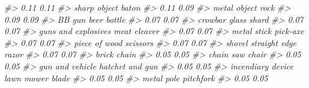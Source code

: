 \documentclass[
]{krantz}
\makeatletter
\newenvironment{Shaded}{\begin{snugshade}}{\end{snugshade}}
\newcommand{\CommentTok}[1]{\textcolor[rgb]{0.37,0.37,0.37}{\textit{#1}}}
\newenvironment{kframe}{%
\medskip{}
\setlength{\fboxsep}{.8em}
 \def\at@end@of@kframe{}%
 \ifinner\ifhmode%
  \def\at@end@of@kframe{\end{minipage}}%
  \begin{minipage}{\columnwidth}%
 \fi\fi%
 \def\FrameCommand##1{\hskip\@totalleftmargin \hskip-\fboxsep
 \colorbox{shadecolor}{##1}\hskip-\fboxsep
     \hskip-\linewidth \hskip-\@totalleftmargin \hskip\columnwidth}%
 \MakeFramed {\advance\hsize-\width
   \@totalleftmargin\z@ \linewidth\hsize
   \@setminipage}}%
 {\par\unskip\endMakeFramed%
 \at@end@of@kframe}
\renewenvironment{Shaded}{\begin{kframe}}{\end{kframe}}
\makeatother
\begin{document}
\begin{Shaded}
\begin{Highlighting}[]
\CommentTok{\#\textgreater{}                             0.11                             0.11 }
\CommentTok{\#\textgreater{}                     sharp object                            baton }
\CommentTok{\#\textgreater{}                             0.11                             0.09 }
\CommentTok{\#\textgreater{}                     metal object                             rock }
\CommentTok{\#\textgreater{}                             0.09                             0.09 }
\CommentTok{\#\textgreater{}                           BB gun                      beer bottle }
\CommentTok{\#\textgreater{}                             0.07                             0.07 }
\CommentTok{\#\textgreater{}                          crowbar                      glass shard }
\CommentTok{\#\textgreater{}                             0.07                             0.07 }
\CommentTok{\#\textgreater{}              guns and explosives                     meat cleaver }
\CommentTok{\#\textgreater{}                             0.07                             0.07 }
\CommentTok{\#\textgreater{}                      metal stick                         pick{-}axe }
\CommentTok{\#\textgreater{}                             0.07                             0.07 }
\CommentTok{\#\textgreater{}                    piece of wood                         scissors }
\CommentTok{\#\textgreater{}                             0.07                             0.07 }
\CommentTok{\#\textgreater{}                           shovel              straight edge razor }
\CommentTok{\#\textgreater{}                             0.07                             0.07 }
\CommentTok{\#\textgreater{}                            brick                            chain }
\CommentTok{\#\textgreater{}                             0.05                             0.05 }
\CommentTok{\#\textgreater{}                        chain saw                            chair }
\CommentTok{\#\textgreater{}                             0.05                             0.05 }
\CommentTok{\#\textgreater{}                  gun and vehicle                  hatchet and gun }
\CommentTok{\#\textgreater{}                             0.05                             0.05 }
\CommentTok{\#\textgreater{}                incendiary device                 lawn mower blade }
\CommentTok{\#\textgreater{}                             0.05                             0.05 }
\CommentTok{\#\textgreater{}                       metal pole                        pitchfork }
\CommentTok{\#\textgreater{}                             0.05                             0.05 }

\end{Highlighting}
\end{Shaded}
\end{document}
